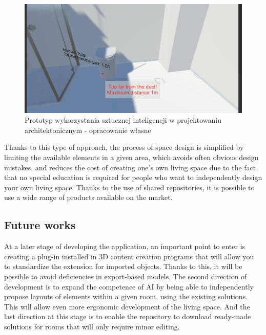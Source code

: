 \documentclass[runningheads]{llncs}
\begin{document}
\begin{figure}[H]
\centering
\includegraphics[width=\textwidth]{aplikacja3.png}
\caption{Prototyp wykorzystania sztucznej inteligencji w projektowaniu architektonicznym - 
opracowanie własne} \label{fig8}
\end{figure}


Thanks to this type of approach, the process of space design is simplified by limiting the available elements in a given area, which avoids often obvious design mistakes, and reduces the cost of creating one's own living space due to the fact that no special education is required for people who want to independently design your own living space. Thanks to the use of shared repositories, it is possible to use a wide range of products available on the market.

\subsection{Future works}
At a later stage of developing the application, an important point to enter is creating a plug-in installed in 3D content creation programs that will allow you to standardize the extension for imported objects. Thanks to this, it will be possible to avoid deficiencies in export-based models. The second direction of development is to expand the competence of AI by being able to independently propose layouts of elements within a given room, using the existing solutions. This will allow even more ergonomic development of the living space. And the last direction at this stage is to enable the repository to download ready-made solutions for rooms that will only require minor editing.
\end{document}

